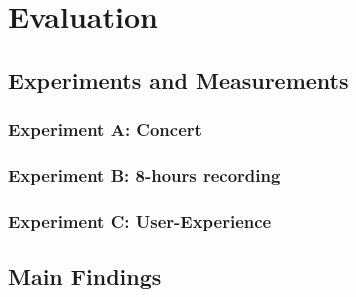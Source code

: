 \chapter{Evaluation}
\section{Experiments and Measurements}
\subsection{Experiment A: Concert}
\subsection{Experiment B: 8-hours recording}
\subsection{Experiment C: User-Experience}

\section{Main Findings}
